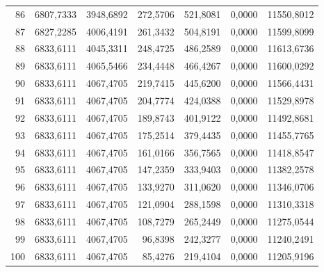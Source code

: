 \begin{small}
\begin{longtable}{rrrrrrr}
86 & 6807,7333 & 3948,6892 & 272,5706 & 521,8081 & 0,0000 & 11550,8012 \\
87 & 6827,2285 & 4006,4191 & 261,3432 & 504,8191 & 0,0000 & 11599,8099 \\
88 & 6833,6111 & 4045,3311 & 248,4725 & 486,2589 & 0,0000 & 11613,6736 \\
89 & 6833,6111 & 4065,5466 & 234,4448 & 466,4267 & 0,0000 & 11600,0292 \\
90 & 6833,6111 & 4067,4705 & 219,7415 & 445,6200 & 0,0000 & 11566,4431 \\
91 & 6833,6111 & 4067,4705 & 204,7774 & 424,0388 & 0,0000 & 11529,8978 \\
92 & 6833,6111 & 4067,4705 & 189,8743 & 401,9122 & 0,0000 & 11492,8681 \\
93 & 6833,6111 & 4067,4705 & 175,2514 & 379,4435 & 0,0000 & 11455,7765 \\
94 & 6833,6111 & 4067,4705 & 161,0166 & 356,7565 & 0,0000 & 11418,8547 \\
95 & 6833,6111 & 4067,4705 & 147,2359 & 333,9403 & 0,0000 & 11382,2578 \\
96 & 6833,6111 & 4067,4705 & 133,9270 & 311,0620 & 0,0000 & 11346,0706 \\
97 & 6833,6111 & 4067,4705 & 121,0904 & 288,1598 & 0,0000 & 11310,3318 \\
98 & 6833,6111 & 4067,4705 & 108,7279 & 265,2449 & 0,0000 & 11275,0544 \\
99 & 6833,6111 & 4067,4705 & 96,8398 & 242,3277 & 0,0000 & 11240,2491 \\
100 & 6833,6111 & 4067,4705 & 85,4276 & 219,4104 & 0,0000 & 11205,9196 \\
\end{longtable}
\end{small}

